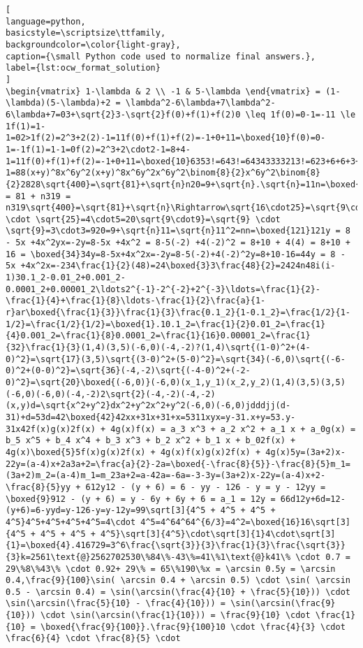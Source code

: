 \documentclass{article}
\begin{document}
\begin{lstlisting}[
language=python,
basicstyle=\scriptsize\ttfamily,
backgroundcolor=\color{light-gray},
caption={\small Python code used to normalize final answers.},
label={lst:ocw_format_solution}
]
\begin{vmatrix} 1-\lambda & 2 \\ -1 & 5-\lambda \end{vmatrix} = (1-\lambda)(5-\lambda)+2 = \lambda^2-6\lambda+7\lambda^2-6\lambda+7=03+\sqrt{2}3-\sqrt{2}f(0)+f(1)+f(2)0 \leq 1f(0)=0-1=-11 \le 1f(1)=1-1=02>1f(2)=2^3+2(2)-1=11f(0)+f(1)+f(2)=-1+0+11=\boxed{10}f(0)=0-1=-1f(1)=1-1=0f(2)=2^3+2\cdot2-1=8+4-1=11f(0)+f(1)+f(2)=-1+0+11=\boxed{10}6353!=643!=64343333213!=623+6+6+3+3+6+1=\boxed{28}636+3-1=88(x+y)^8x^6y^2(x+y)^8x^6y^2x^6y^2\binom{8}{2}x^6y^2\binom{8}{2}2828\sqrt{400}=\sqrt{81}+\sqrt{n}n20=9+\sqrt{n}.\sqrt{n}=11n=\boxed{121}.121\sqrt{400}=\sqrt{81}+\sqrt{n}400 = 81 + n319 = n319\sqrt{400}=\sqrt{81}+\sqrt{n}\Rightarrow\sqrt{16\cdot25}=\sqrt{9\cdot9}+\sqrt{n}\sqrt{16\cdot25}=\sqrt{16} \cdot \sqrt{25}=4\cdot5=20\sqrt{9\cdot9}=\sqrt{9} \cdot \sqrt{9}=3\cdot3=920=9+\sqrt{n}11=\sqrt{n}11^2=nn=\boxed{121}121y = 8 - 5x +4x^2yx=-2y=8-5x +4x^2 = 8-5(-2) +4(-2)^2 = 8+10 + 4(4) = 8+10 + 16 = \boxed{34}34y=8-5x+4x^2x=-2y=8-5(-2)+4(-2)^2y=8+10-16=44y = 8 - 5x +4x^2x=-234\frac{1}{2}(48)=24\boxed{3}3\frac{48}{2}=2424n48i(i-1)30.1_2-0.01_2+0.001_2-0.0001_2+0.00001_2\ldots2^{-1}-2^{-2}+2^{-3}\ldots=\frac{1}{2}-\frac{1}{4}+\frac{1}{8}\ldots-\frac{1}{2}\frac{a}{1-r}ar\boxed{\frac{1}{3}}\frac{1}{3}\frac{0.1_2}{1-0.1_2}=\frac{1/2}{1-1/2}=\frac{1/2}{1/2}=\boxed{1}.10.1_2=\frac{1}{2}0.01_2=\frac{1}{4}0.001_2=\frac{1}{8}0.0001_2=\frac{1}{16}0.00001_2=\frac{1}{32}\frac{1}{3}(1,4)(3,5)(-6,0)(-4,-2)?(1,4)\sqrt{(1-0)^2+(4-0)^2}=\sqrt{17}(3,5)\sqrt{(3-0)^2+(5-0)^2}=\sqrt{34}(-6,0)\sqrt{(-6-0)^2+(0-0)^2}=\sqrt{36}(-4,-2)\sqrt{(-4-0)^2+(-2-0)^2}=\sqrt{20}\boxed{(-6,0)}(-6,0)(x_1,y_1)(x_2,y_2)(1,4)(3,5)(3,5)(-6,0)(-6,0)(-4,-2)2\sqrt{2}(-4,-2)(-4,-2)(x,y)d=\sqrt{x^2+y^2}dx^2+y^2x^2+y^2(-6,0)(-6,0)jdddjj(d-31)+d=53d=42\boxed{42}42xx+31x+31+x=5311xyx=y-31.x+y=53.y-31x42f(x)g(x)2f(x) + 4g(x)f(x) = a_3 x^3 + a_2 x^2 + a_1 x + a_0g(x) = b_5 x^5 + b_4 x^4 + b_3 x^3 + b_2 x^2 + b_1 x + b_02f(x) + 4g(x)\boxed{5}5f(x)g(x)2f(x) + 4g(x)f(x)g(x)2f(x) + 4g(x)5y=(3a+2)x-22y=(a-4)x+2a3a+2=\frac{a}{2}-2a=\boxed{-\frac{8}{5}}-\frac{8}{5}m_1=(3a+2)m_2=(a-4)m_1=m_23a+2=a-42a=-6a=-3-3y=(3a+2)x-22y=(a-4)x+2-\frac{8}{5}yy + 612y12 - (y + 6) = 6 - yy - 126 - y = y - 12yy = \boxed{9}912 - (y + 6) = y - 6y + 6y + 6 = a_1 = 12y = 66d12y+6d=12-(y+6)=6-yyd=y-126-y=y-12y=99\sqrt[3]{4^5 + 4^5 + 4^5 + 4^5}4^5+4^5+4^5+4^5=4\cdot 4^5=4^64^64^{6/3}=4^2=\boxed{16}16\sqrt[3]{4^5 + 4^5 + 4^5 + 4^5}\sqrt[3]{4^5}\cdot\sqrt[3]{1}4\cdot\sqrt[3]{1}=\boxed{4}.416729=3^6\frac{\sqrt{3}}{3}\frac{1}{3}\frac{\sqrt{3}}{3}k=2561\text{@}2562702530\%84\%-43\%=41\%1\text{@}k41\% \cdot 0.7 = 29\%8\%43\% \cdot 0.92+ 29\% = 65\%190\%x = \arcsin 0.5y = \arcsin 0.4,\frac{9}{100}\sin( \arcsin 0.4 + \arcsin 0.5) \cdot \sin( \arcsin 0.5 - \arcsin 0.4) = \sin(\arcsin(\frac{4}{10} + \frac{5}{10})) \cdot \sin(\arcsin(\frac{5}{10} - \frac{4}{10})) = \sin(\arcsin(\frac{9}{10})) \cdot \sin(\arcsin(\frac{1}{10})) = \frac{9}{10} \cdot \frac{1}{10} = \boxed{\frac{9}{100}}.\frac{9}{100}10 \cdot \frac{4}{3} \cdot \frac{6}{4} \cdot \frac{8}{5} \cdot 
\end{lstlisting}
\end{document}
